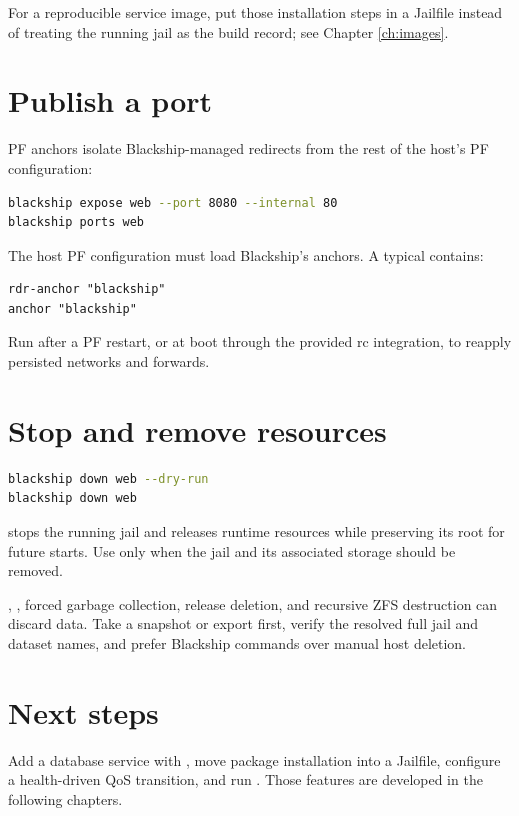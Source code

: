 For a reproducible service image, put those installation steps in a Jailfile
instead of treating the running jail as the build record; see Chapter
\ref{ch:images}.

\section{Publish a port}

PF anchors isolate Blackship-managed redirects from the rest of the host's PF
configuration:

\begin{lstlisting}[language=bash]
blackship expose web --port 8080 --internal 80
blackship ports web
\end{lstlisting}

The host PF configuration must load Blackship's anchors. A typical
 contains:

\begin{lstlisting}
rdr-anchor "blackship"
anchor "blackship"
\end{lstlisting}

Run  after a PF restart, or at boot through the
provided rc integration, to reapply persisted networks and forwards.

\section{Stop and remove resources}

\begin{lstlisting}[language=bash]
blackship down web --dry-run
blackship down web
\end{lstlisting}

 stops the running jail and releases runtime resources while
preserving its root for future starts. Use  only when the
jail and its associated storage should be removed.

\begin{shipwarning}
, , forced garbage
collection, release deletion, and recursive ZFS destruction can discard data.
Take a snapshot or export first, verify the resolved full jail and dataset names,
and prefer Blackship commands over manual host deletion.
\end{shipwarning}

\section{Next steps}

Add a database service with , move package
installation into a Jailfile, configure a health-driven QoS transition, and run
. Those features are developed in the following
chapters.

